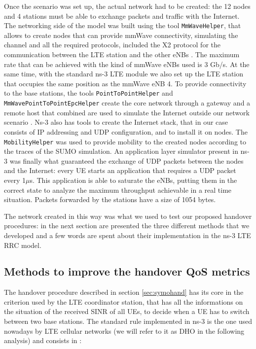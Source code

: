 \documentclass[conference,10pt]{IEEEtran}
\begin{document}
Once the scenario was set up, the actual network had to be created: the 12 nodes and 4 stations must be able to exchange packets and traffic with the Internet. The networking side of the model was built using the tool \texttt{MmWaveHelper}, that allows to create nodes that can provide mmWave connectivity, simulating the channel and all the required protocols, included the X2 protocol for the communication between the LTE station and the other eNBs \cite{e2esim}. The maximum rate that can be achieved with the kind of mmWave eNBs used is 3 Gb/s. At the same time, with the standard ns-3 LTE module we also set up the LTE station that occupies the same position as the mmWave eNB 4. To provide connectivity to the base stations, the tools \texttt{PointToPointHelper} and \texttt{MmWavePointToPointEpcHelper} create the core network through a gateway and a remote host that combined are used to simulate the Internet outside our network scenario \cite{e2esim}. Ns-3 also has tools to create the Internet stack, that in our case consists of IP addressing and UDP configuration, and to install it on nodes. 
The \texttt{MobilityHelper} was used to provide mobility to the created nodes according to the traces of the SUMO simulation. An application layer simulator present in ns-3 was finally what guaranteed the exchange of UDP packets between the nodes and the Internet: every UE starts an application that requires a UDP packet every 1$\mu$s. This application is able to saturate the eNBs, putting them in the correct state to analyze the maximum throughput achievable in a real time situation. Packets forwarded by the stations have a size of 1054 bytes. 

The network created in this way was what we used to test our proposed handover procedures: in the next section are presented the three different methods that we developed and a few words are spent about their implementation in the ns-3 LTE RRC model.
 

\subsection{Methods to improve the handover QoS metrics}

The handover procedure described in section \ref{sec:symohand} has its core in the criterion used by the LTE coordinator station, that has all the informations on the situation of the received SINR of all UEs, to decide when a UE has to switch between two base stations. The standard rule implemented in ns-3 is the one used nowadays by LTE cellular networks (we will refer to it as DHO in the following analysis) and consists in \cite{imphand}:
\end{document}
